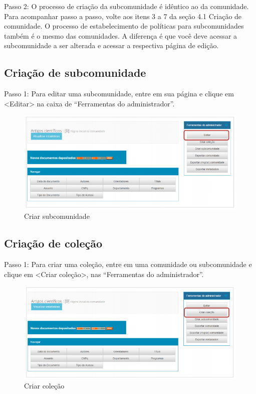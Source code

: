\documentclass[12pt,hidelinks]{article}
\begin{document}
    Passo 2: O processo de criação da subcomunidade é idêntico ao da comunidade. Para acompanhar passo a passo, volte aos itens 3 a 7 da seção 4.1 Criação de comunidade. O processo de estabelecimento de políticas para subcomunidades também é o mesmo das comunidades. A diferença é que você deve acessar a subcomunidade a ser alterada e acessar a respectiva página de edição.
    
    \subsection{Criação de subcomunidade} 
    
    Passo 1: Para editar uma subcomunidade, entre em sua página e clique em <Editar> na caixa de “Ferramentas do administrador”.
    
    \begin{figure}[!htp]
                \centering
                \includegraphics[scale=0.8]{figura/Figura32.png}
                \caption{Criar subcomunidade}
            \label{Rotulo}
        \end{figure}

\newpage  
    \subsection{Criação de coleção}
    
    Passo 1: Para criar uma coleção, entre em uma comunidade ou subcomunidade e clique em <Criar coleção>, nas “Ferramentas do administrador”.
    
    \begin{figure}[!htp]
                \centering
                \includegraphics[scale=0.8]{figura/Figura33.png}
                \caption{Criar coleção}
            \label{Rotulo}
        \end{figure}
\end{document}
